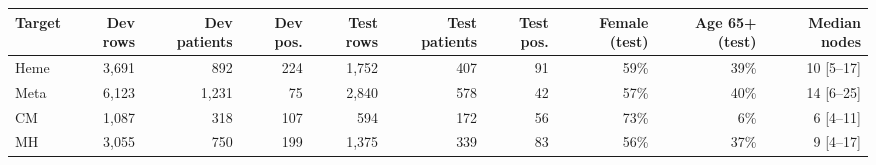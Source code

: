 \begin{tabular}{lrrrrrrrrr}
\hline
Target & Dev rows & Dev patients & Dev pos. & Test rows & Test patients & Test pos. & Female (test) & Age 65+ (test) & Median nodes \\
\hline
Heme & 3,691 & 892 & 224 & 1,752 & 407 & 91 & 59\% & 39\% & 10 [5--17] \\
Meta & 6,123 & 1,231 & 75 & 2,840 & 578 & 42 & 57\% & 40\% & 14 [6--25] \\
CM & 1,087 & 318 & 107 & 594 & 172 & 56 & 73\% & 6\% & 6 [4--11] \\
MH & 3,055 & 750 & 199 & 1,375 & 339 & 83 & 56\% & 37\% & 9 [4--17] \\
\hline
\end{tabular}

